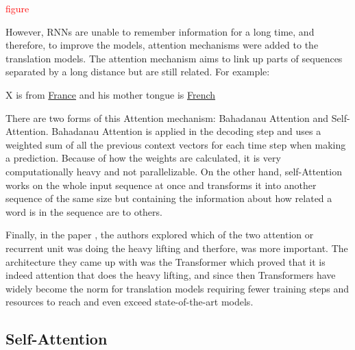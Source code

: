 \documentclass[12pt,a4paper,twoside,openright]{report}
\newcommand{\red}[1]{\textcolor{red}{#1}}
\newcommand{\changedFont}[1]{{\fontfamily{qcr}\selectfont #1}}
\begin{document}
\red{figure}

However, RNNs are unable to remember information for a long time, and therefore, to improve the models, attention mechanisms were added to the translation models. The attention mechanism aims to link up parts of sequences separated by a long distance but are still related. For example: 
\begin{center}
    \changedFont{X is from \underline{France} and his mother tongue is \underline{French}}
\end{center}
There are two forms of this Attention mechanism: Bahadanau Attention and Self-Attention. Bahadanau Attention is applied in the decoding step and uses a weighted sum of all the previous context vectors for each time step when making a prediction. Because of how the weights are calculated, it is very computationally heavy and not parallelizable. On the other hand, self-Attention works on the whole input sequence at once and transforms it into another sequence of the same size but containing the information about how related a word is in the sequence are to others. 

Finally, in the paper \cite{transformers}, the authors explored which of the two attention or recurrent unit was doing the heavy lifting and therfore, was more important. The architecture they came up with was the Transformer which proved that it is indeed attention that does the heavy lifting, and since then Transformers have widely become the norm for translation models requiring fewer training steps and resources to reach and even exceed state-of-the-art models.


\subsection{Self-Attention}
\label{self-attention}
\end{document}
